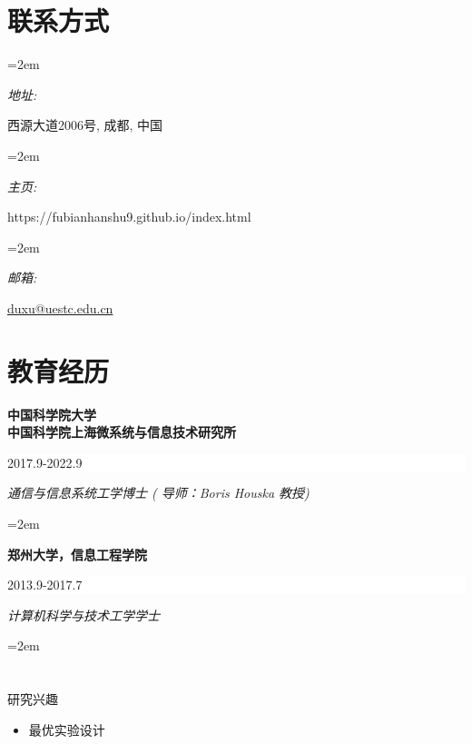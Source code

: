 \documentclass[paper=a4,fontsize=11pt]{scrartcl} %
\newlength{\spacebox}
\newcommand{\sepspace}{\vspace*{1em}}		%
\newcommand{\MyName}[1]{ %
		\Huge \usefont{OT1}{phv}{b}{n} \hfill #1
		\par \normalsize \normalfont}
\newcommand{\MySlogan}[1]{ %
		\large \usefont{OT1}{phv}{m}{n}\hfill \textit{#1}
		\par \normalsize \normalfont}
\newcommand{\NewPart}[1]{\section*{\uppercase{#1}}}
\newcommand{\PersonalEntry}[2]{
		\noindent\hangindent=2em\hangafter=0 %
		\parbox{\spacebox}{        %
		\textit{#1}}		       %
		\hspace{1.5em} #2 \par}    %
\newcommand{\EducationEntry}[4]{
		\noindent \textbf{#1} \hfill      %
		\colorbox{White}{%
			\parbox{5cm}{%
			\hfill\color{Black}#2}} \par  %
		\noindent \textit{#3} \par        %
		\noindent\hangindent=2em\hangafter=0 \small #4 %
		\normalsize \par}
\begin{document}
		\begin{CJK*}{UTF8}{gbsn}
{
	\par \normalsize \normalfont}


\NewPart{联系方式}{}

\PersonalEntry{地址:}{ 西源大道2006号, 成都, 中国}
\PersonalEntry{主页:}{https://fubianhanshu9.github.io/index.html}
\PersonalEntry{邮箱:}{\url{duxu@uestc.edu.cn}}%


\NewPart{教育经历}{}

\EducationEntry{中国科学院大学\\中国科学院上海微系统与信息技术研究所}{2017.9-2022.9}{通信与信息系统工学博士 ( 导师：Boris Houska 教授) }

\sepspace

\EducationEntry{郑州大学，信息工程学院}{2013.9-2017.7}{计算机科学与技术工学学士 }

\NewPart{研究兴趣}{}
\begin{itemize}
	\item{最优实验设计}
	

\end{itemize}
\end{CJK*}
\end{document}
